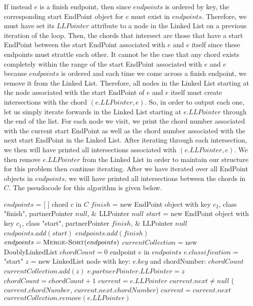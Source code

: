 \documentclass[11pt]{article}
\begin{document}
If instead $e$ is a finish endpoint, then since $endpoints$ is ordered by key, the corresponding start EndPoint object for $e$ must exist in $endpoints$. Therefore, we must have set its $LLPointer$ attribute to a node in the Linked List on a previous iteration of the loop. Then, the chords that intersect are those that have a start EndPoint between the start EndPoint associated with $e$ and $e$ itself since these endpoints must strattle each other. It cannot be the case that any chord exists completely within the range of the start EndPoint associated with $e$ and $e$ because $endpoints$ is ordered and each time we come across a finish endpoint, we remove it from the Linked List. Therefore, all nodes in the Linked List starting at the node associated with the start EndPoint of $e$ and $e$ itself must create intersections with the chord $(e.LLPointer, e)$. So, in order to output each one, let us simply iterate forwards in the Linked List starting at $e.LLPointer$ through the end of the list. For each node we visit, we print the chord number associated with the current start EndPoint as well as the chord number associated with the next start EndPoint in the Linked List. After iterating through each intersection, we then will have printed all intersections associated with $(e.LLPointer, e)$. We then remove $e.LLPointer$ from the Linked List in order to maintain our structure for this problem then continue iterating. After we have iterated over all EndPoint objects in $endpoints$, we will have printed all intersections between the chords in $C$. The pseudocode for this algorithm is given below.

\begin{codebox}
\li $endpoints$ = [ ]
\li \For chord $c$ in $C$ \Do
\li     $finish$ = new EndPoint object with key $c_2$, class "finish", partnerPointer $null$, & LLPointer $null$
\li     $start$ = new EndPoint object with key $c_1$, class "start", partnerPointer $finish$, & LLPointer $null$
\li     $endpoints.add(start)$
\li     $endpoints.add(finish)$
\li \End
\li $endpoints = \textnormal{\scshape Merge-Sort}(endpoints)$
\li $currentCollection$ = new DoublyLinkedList
\li $chordCount = 0$
\li
\li \For endpoint $e$ in $endpoints$ \Do
\li     \If $e.classification$ = "start" \Then
\li         $z$ = new LinkedList node with key: $e.key$ and chordNumber: $chordCount$
\li         $currentCollection.add(z)$
\li         $e.partnerPointer.LLPointer = z$
\li         $chordCount = chordCount + 1$
\li     \Else
\li         $current = e.LLPointer$
\li         \While $current.next \neq null$ \Do
\li             {}($current.chordNumber$, $current.next.chordNumber$)
\li             $current = current.next$
            \End
\li         $currentCollection.remove(e.LLPointer)$
        \End
    \End
\end{codebox}
\end{document}
